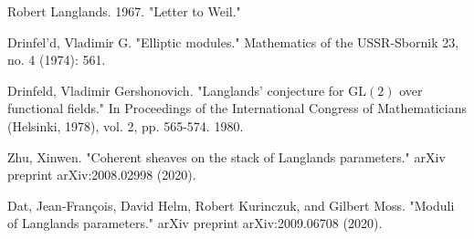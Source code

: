 \documentclass[12pt]{book}
\theoremstyle{definition}
\begin{document}
\begin{thebibliography}{}
 Robert Langlands. 1967. "Letter to Weil."

 Drinfel'd, Vladimir G. "Elliptic modules." Mathematics of the USSR-Sbornik 23, no. 4 (1974): 561.

 Drinfeld, Vladimir Gershonovich. "Langlands' conjecture for $\mathrm{GL}(2)$ over functional fields." In Proceedings of the International Congress of Mathematicians (Helsinki, 1978), vol. 2, pp. 565-574. 1980.

 Zhu, Xinwen. "Coherent sheaves on the stack of Langlands parameters." arXiv preprint arXiv:2008.02998 (2020).

 Dat, Jean-Fran\c{c}ois, David Helm, Robert Kurinczuk, and Gilbert Moss. "Moduli of Langlands parameters." arXiv preprint arXiv:2009.06708 (2020).



\end{thebibliography}
 






	
\end{document}
